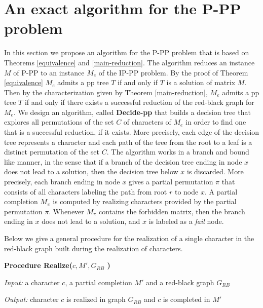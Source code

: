 \documentclass{llncs}
\newcommand{\pp}{Decide-pp}
\newcommand{\grb}{$G_{RB}$ }
\begin{document}
\section{An exact algorithm for the P-PP problem}
In this section we propose an algorithm for   the P-PP problem that is based on Theorems \ref{equivalence} and \ref{main-reduction}.
The algorithm   reduces an instance $M$ of P-PP to an instance $M_e$ of the  IP-PP problem.  By the proof of Theorem \ref{equivalence} $M_e$  admits a pp tree $T$ if and only if $T$ is a solution of  matrix $M$. 
Then by the characterization given by Theorem \ref{main-reduction},  $M_e$ admits a pp tree $T$ if and only if there exists a successful reduction of the red-black graph for $M_e$.   We design an algorithm, called {\bf  \pp}  that  builds a  decision tree that explores all permutations of  the set $C$ of  characters  of $M_e$ in order to find one that is a successful reduction, if it exists.  More precisely, each edge of the decision tree  represents a character and each path of the tree from the root to a leaf is a distinct permutation of the set $C$.  
The algorithm works in a branch and bound like manner, in the sense that if a branch of the decision tree ending in node $x$ does not lead to a solution, then the decision tree below $x$ is discarded.  More precisely,  each branch ending in node $x$   gives a partial permutation  $\pi$  that consists of all characters labeling the path from root $r$ to  node $x$. A partial completion  $M_{\pi}$ is computed by realizing characters provided by the partial permutation $\pi$. Whenever $M_{\pi}$ contains the forbidden matrix,  then the branch ending in $x$ does  not lead to a solution, and $x$ is labeled as a {\em fail} node.



\vspace{.2in}

Below we give a general procedure for the realization of a single character in the red-black graph built during the realization of characters.


{\bf Procedure Realize($c, M',$\grb )}

 {\em Input:} a  character $c$, a partial completion $M'$ and a red-black graph \grb  

 {\em Output:} character $c$ is realized in graph \grb and $c$ is completed in  $M'$
\end{document}
